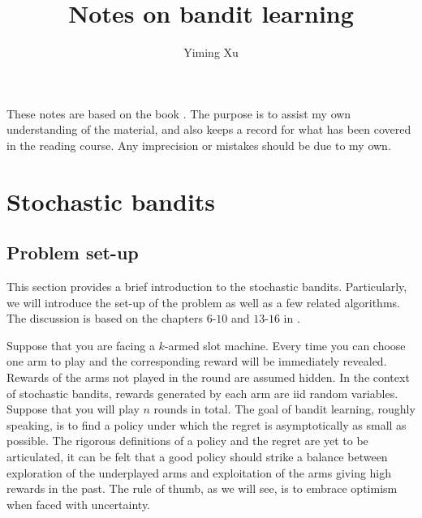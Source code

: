 \documentclass[10pt,a4paper]{amsart}
\numberwithin{equation}{section}
\theoremstyle{plain}
\theoremstyle{definition}
\begin{document}
\title{\textbf{Notes on bandit learning}}
\date{}
\author{Yiming Xu}
\maketitle


These notes are based on the book \cite{lattimore2018bandit}.  The purpose is to assist my own understanding of the material, and also keeps a record for what has been covered in the reading course. Any imprecision or mistakes should be due to my own. 

\section{Stochastic bandits}\label{sec1}

\subsection{Problem set-up}

This section provides a brief introduction to the stochastic bandits. Particularly, we will introduce the set-up of the problem as well as a few related algorithms. The discussion is based on the chapters $6$-$10$ and $13$-$16$ in \cite{lattimore2018bandit}.

Suppose that you are facing a $k$-armed slot machine. Every time you can choose one arm to play and the corresponding reward will be immediately revealed. Rewards of the arms not played in the round are assumed hidden. In the context of stochastic bandits, rewards generated by each arm are iid random variables. Suppose that you will play $n$ rounds in total. The goal of bandit learning, roughly speaking, is to find a policy under which the regret is asymptotically as small as possible. The rigorous definitions of a policy and the regret are yet to be articulated, it can be felt that a good policy should strike a balance between exploration of the underplayed arms and exploitation of the arms giving high rewards in the past. The rule of thumb, as we will see, is to embrace optimism when faced with uncertainty. 
\end{document}
